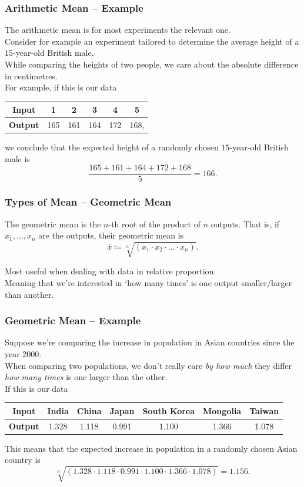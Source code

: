 \documentclass[aspectratio=169,11pt,svgnames]{beamer}
\begin{document}
\begin{frame}
 \frametitle{Arithmetic Mean -- Example}
 The arithmetic mean is for most experiments the relevant one.\\
 \pause
 Consider for example an experiment tailored to determine the average height of
 a $15$-year-old British male.\\
 \pause
 While comparing the heights of two people, we care about the \alert{absolute}
 difference in centimetres.\\
 \pause
 For example, if this is our data
 \begin{center}
  \begin{tabular}{c|ccccc}
   \textbf{Input} & 1 & 2 & 3 & 4 & 5\\
   \midrule
   \textbf{Output} & 165 & 161 & 164 & 172 & 168,
  \end{tabular}
 \end{center}
 we conclude that the expected height of a randomly chosen $15$-year-old British
 male is
 \[
  \frac{165 + 161 + 164 + 172 + 168}{5} = 166.
 \]
\end{frame}

\begin{frame}
 \frametitle{Types of Mean -- Geometric Mean}
 \begin{tcolorbox}[title=Geometric Mean]
  The \alert{geometric mean} is the $n$-th root of the product of $n$ outputs.
  That is, if $x_1,\ldots,x_n$ are the outputs, their geometric mean is
  \[
   \bar{x} \coloneqq \sqrt[n]{(x_1 \cdot x_2 \cdot \ldots \cdot x_n)}.
  \]
 \end{tcolorbox}
 \pause
 Most useful when dealing with data in \alert{relative} proportion.\\
 \pause
 Meaning that we're interested in `\alert{how many times}' is one output
 smaller/larger than another.
\end{frame}

\begin{frame}
 \frametitle{Geometric Mean -- Example}
 Suppose we're comparing the increase in population in Asian countries since the
 year 2000.\\
 \pause
 When comparing two populations, we don't really care \emph{by how much} they
 differ \emph{how many times} is one larger than the other.\\
 \pause
 If this is our data
 \begin{center}
  \begin{tabular}{c|cccccc}
   \textbf{Input} & India & China & Japan & South Korea & Mongolia & Taiwan\\
   \midrule
   \textbf{Output} & 1.328 & 1.118 & 0.991 & 1.100 & 1.366 & 1.078
  \end{tabular}
 \end{center}
 This means that the expected increase in population in a randomly chosen Asian
 country is
 \[
  \sqrt[6]{(1.328 \cdot 1.118 \cdot 0.991 \cdot 1.100 \cdot 1.366 \cdot 1.078)}
  = 1.156.
 \]
\end{frame}
\end{document}
